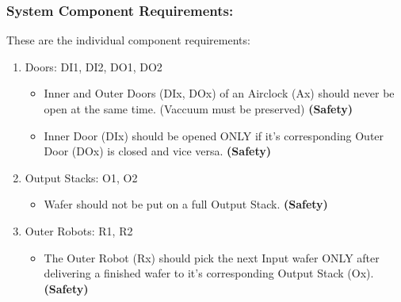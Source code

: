 \documentclass[a4paper,12pt]{article}
\begin{document}
\subsubsection{System Component Requirements:}
These are the individual component requirements:
\begin{enumerate}
\item Doors: DI1, DI2, DO1, DO2
	\begin{itemize}
	\item Inner and Outer Doors  (DIx, DOx) of an Airclock (Ax) should never be open at the same time. (Vaccuum must be preserved) \textbf{ (Safety)}
	\item Inner Door (DIx) should be opened ONLY if it's corresponding Outer Door (DOx) is closed and vice versa. \textbf{ (Safety)}
	\end{itemize}

\item Output Stacks: O1, O2
	\begin{itemize}
	\item Wafer should not be put on a full Output Stack.\textbf{ (Safety)}
	\end{itemize}

\item Outer Robots: R1, R2
	\begin{itemize}
	\item The Outer Robot (Rx) should pick the next Input wafer ONLY after delivering a finished wafer to it's corresponding Output Stack (Ox).\textbf{ (Safety)}
	\end{itemize}


\end{enumerate}
\end{document}
